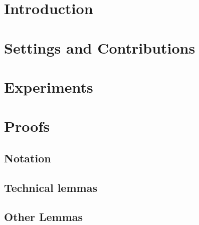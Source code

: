




\maketitle

\begin{abstract}

\end{abstract}


\section{Introduction}


\section{Settings and Contributions}


\section{Experiments}





\tableofcontents

\newpage

\section{Proofs}

\subsection{Notation}


\subsection{Technical lemmas}


\subsection{Other Lemmas}


